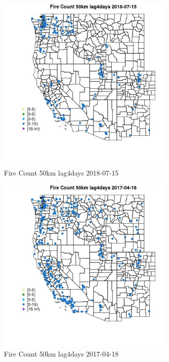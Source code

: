 \begin{figure} 
\centering  
\includegraphics[width=0.77\textwidth]{Code_Outputs/Report_ML_input_PM25_Step4_part_e_de_duplicated_aves_compiled_2019-05-21wNAs_MapObsFire_Count_50km_lag4days2018-07-15.jpg} 
\caption{\label{fig:Report_ML_input_PM25_Step4_part_e_de_duplicated_aves_compiled_2019-05-21wNAsMapObsFire_Count_50km_lag4days2018-07-15}Fire Count 50km lag4days 2018-07-15} 
\end{figure} 
 

\begin{figure} 
\centering  
\includegraphics[width=0.77\textwidth]{Code_Outputs/Report_ML_input_PM25_Step4_part_e_de_duplicated_aves_compiled_2019-05-21wNAs_MapObsFire_Count_50km_lag4days2017-04-18.jpg} 
\caption{\label{fig:Report_ML_input_PM25_Step4_part_e_de_duplicated_aves_compiled_2019-05-21wNAsMapObsFire_Count_50km_lag4days2017-04-18}Fire Count 50km lag4days 2017-04-18} 
\end{figure} 
 

